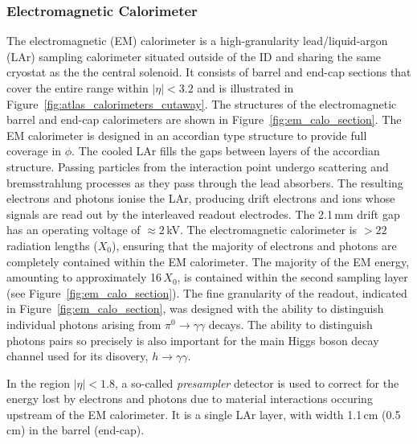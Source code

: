 \subsubsection{Electromagnetic Calorimeter}
\label{sec:calo_em}

The electromagnetic (EM) calorimeter is a high-granularity lead/liquid-argon (LAr)
sampling calorimeter situated outside of the ID and sharing the
same cryostat as the the central solenoid.
It consists of barrel and end-cap sections that cover the entire
range within $\lvert \eta \rvert < 3.2$ and is illustrated in Figure~\ref{fig:atlas_calorimeters_cutaway}.
The structures of the electromagnetic barrel and end-cap calorimeters
are shown in Figure~\ref{fig:em_calo_section}.
The EM calorimeter is designed in an accordian type structure to provide full coverage
in $\phi$.
The cooled LAr fills the gaps between layers of the
accordian structure.
Passing particles from the interaction point undergo scattering and bremsstrahlung processes as they pass through
the lead absorbers. The resulting electrons and photons ionise the LAr, producing
drift electrons and ions whose signals are read out by the interleaved readout
electrodes. The 2.1\,mm drift gap has an operating voltage of $\approx 2$\,kV.
The electromagnetic calorimeter is $>22$ radiation lengths ($X_0$), ensuring
that the majority of electrons and photons are completely contained within the EM calorimeter.
The majority of the EM energy, amounting to approximately 16\,$X_0$, is contained
within the second sampling layer (see Figure~\ref{fig:em_calo_section}).
The fine granularity of the readout, indicated in Figure~\ref{fig:em_calo_section},
was designed with the ability to distinguish individual photons arising from $\pi^0 \rightarrow \gamma \gamma$
decays. The ability to distinguish photons pairs so precisely is also important for the
main Higgs boson decay channel used for its disovery, $h \rightarrow \gamma \gamma$.

In the region $\lvert \eta \rvert < 1.8$, a so-called \textit{presampler} detector is used to correct
for the energy lost by electrons and photons due to material interactions occuring
upstream of the EM calorimeter.
It is a single LAr layer, with width 1.1\,cm (0.5\,cm) in the barrel (end-cap).

